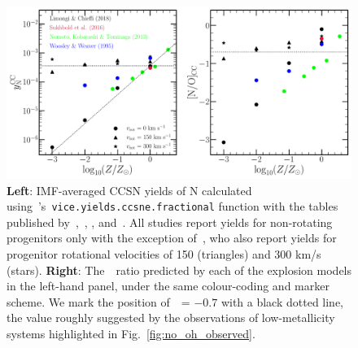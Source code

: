 \documentclass[ms.tex]{subfiles}
\begin{document}
\begin{figure} 
\centering 
\includegraphics[scale = 0.5]{n_cc_yields.pdf} 
\caption{
\textbf{Left}: IMF-averaged CCSN yields of N calculated 
using~\vice's~\texttt{vice.yields.ccsne.fractional} function with the tables 
published by~\citet[][blue]{Woosley1995},~\citet*[][green]{Nomoto2013}, 
\citet[][red]{Sukhbold2016}, and~\citet[][black]{Limongi2018}. 
All studies report yields for non-rotating progenitors only with the exception 
of~\citet{Limongi2018}, who also report yields for progenitor rotational 
velocities of 150 (triangles) and 300 km/s (stars). 
\textbf{Right}: The~\no~ratio predicted by each of the explosion models in 
the left-hand panel, under the same colour-coding and marker scheme. 
We mark the position of~\no~= $-0.7$ with a black dotted line, the value 
roughly suggested by the observations of low-metallicity systems highlighted in 
Fig.~\ref{fig:no_oh_observed}. 
}
\label{fig:n_cc_yields} 
\end{figure} 
\end{document}
